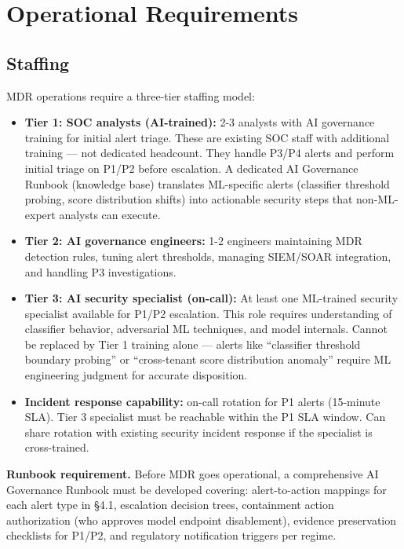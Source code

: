 \section{Operational Requirements}
\label{sec:monitoring-7}


\subsection{Staffing}


MDR operations require a three-tier staffing model:

\begin{itemize}
  \item \textbf{Tier 1: SOC analysts (AI-trained):} 2-3 analysts with AI governance training for initial alert triage. These are existing SOC staff with additional training --- not dedicated headcount. They handle P3/P4 alerts and perform initial triage on P1/P2 before escalation. A dedicated AI Governance Runbook (knowledge base) translates ML-specific alerts (classifier threshold probing, score distribution shifts) into actionable security steps that non-ML-expert analysts can execute.
  \item \textbf{Tier 2: AI governance engineers:} 1-2 engineers maintaining MDR detection rules, tuning alert thresholds, managing SIEM/SOAR integration, and handling P3 investigations.
  \item \textbf{Tier 3: AI security specialist (on-call):} At least one ML-trained security specialist available for P1/P2 escalation. This role requires understanding of classifier behavior, adversarial ML techniques, and model internals. Cannot be replaced by Tier 1 training alone --- alerts like ``classifier threshold boundary probing'' or ``cross-tenant score distribution anomaly'' require ML engineering judgment for accurate disposition.
  \item \textbf{Incident response capability:} on-call rotation for P1 alerts (15-minute SLA). Tier 3 specialist must be reachable within the P1 SLA window. Can share rotation with existing security incident response if the specialist is cross-trained.
\end{itemize}


\textbf{Runbook requirement.} Before MDR goes operational, a comprehensive AI Governance Runbook must be developed covering: alert-to-action mappings for each alert type in \S{}4.1, escalation decision trees, containment action authorization (who approves model endpoint disablement), evidence preservation checklists for P1/P2, and regulatory notification triggers per regime.

